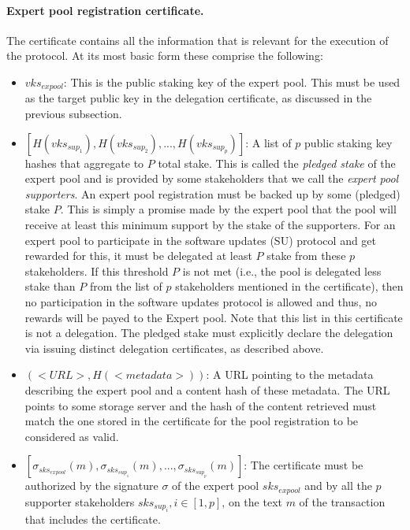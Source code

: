 \paragraph{Expert pool registration certificate.}
The certificate contains all the information that is relevant for the execution of the protocol. At its most basic form these comprise the following:
\begin{itemize}
\item $vks_{expool}$: This is the public staking key of the expert pool. This must be used as the target public key in the delegation certificate, as discussed in the previous subsection.

\item $[H(vks_{sup_1}), H(vks_{sup_2}), ...,H(vks_{sup_p})] $: A list of $p$ public staking key hashes that aggregate to $P$ total stake. This is called the \emph{pledged stake} of the expert pool and is provided by some stakeholders that we call the \emph{expert pool supporters}. An expert pool registration must be backed up by some (pledged) stake $P$. This is simply a promise made by the expert pool that the pool will receive at least this minimum support by the stake of the supporters. For an expert pool to participate in the software updates (SU) protocol and get rewarded for this, it must be delegated at least $P$ stake from these $p$ stakeholders. If this threshold $P$ is not met (i.e., the pool is delegated less stake than $P$ from the list of $p$ stakeholders mentioned in the certificate), then no participation in the software updates protocol is allowed and thus, no rewards will be payed to the Expert pool. Note that this list in this certificate is not a delegation. The pledged stake must explicitly declare the delegation via issuing distinct delegation certificates, as described above.

\item $(<URL>, H(<metadata>))$: A URL pointing to the metadata describing the expert pool and a content hash of these metadata. The URL points to some storage server and the hash of the content retrieved must match the one stored in the certificate for the pool registration to be considered as valid.

\item $[\sigma_{sks_{expool}}(m),\sigma_{sks_{sup_1}}(m),...,\sigma_{sks_{sup_p}}(m)]$: The certificate must be authorized by the signature $\sigma$ of the expert pool $sks_{expool}$ and by all the $p$ supporter stakeholders $sks_{sup_i}, i \in [1,p]$, on the text $m$ of the transaction that includes the certificate.  
\end{itemize} 

